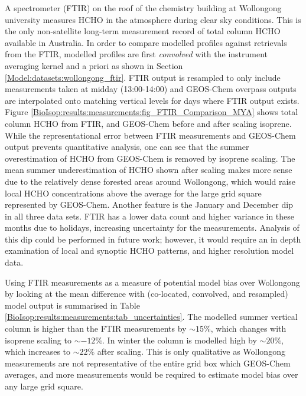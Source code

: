     A spectrometer (FTIR) on the roof of the chemistry building at Wollongong university measures HCHO in the atmosphere during clear sky conditions.
    This is the only non-satellite long-term measurement record of total column HCHO available in Australia.
    In order to compare modelled profiles against retrievals from the FTIR, modelled profiles are first \textit{convolved} with the instrument averaging kernel and a priori as shown in Section \ref{Model:datasets:wollongong_ftir}.
    FTIR output is resampled to only include measurements taken at midday (13:00-14:00) and GEOS-Chem overpass outputs are interpolated onto matching vertical levels for days where FTIR output exists.
    Figure \ref{BioIsop:results:measurements:fig_FTIR_Comparison_MYA} shows total column HCHO from FTIR, and GEOS-Chem before and after scaling isoprene.
    While the representational error between FTIR measurements and GEOS-Chem output prevents quantitative analysis, one can see that the summer overestimation of HCHO from GEOS-Chem is removed by isoprene scaling.
    The mean summer underestimation of HCHO shown after scaling makes more sense due to the relatively dense forested areas around Wollongong, which would raise local HCHO concentrations above the average for the large grid square represented by GEOS-Chem.
    Another feature is the January and December dip in all three data sets.
    FTIR has a lower data count and higher variance in these months due to holidays, increasing uncertainty for the measurements.
    Analysis of this dip could be performed in future work; however, it would require an in depth examination of local and synoptic HCHO patterns, and higher resolution model data.
    
  
    Using FTIR measurements as a measure of potential model bias over Wollongong by looking at the mean difference with (co-located, convolved, and resampled) model output is summarised in Table \ref{BioIsop:results:measurements:tab_uncertainties}.
    The modelled summer vertical column is higher than the FTIR measurements by $\sim{15}\%$, which changes with isoprene scaling to $\sim{-12}\%$.
    In winter the column is modelled high by $\sim{20}\%$, which increases to $\sim{22}\%$ after scaling.
    This is only qualitative as Wollongong measurements are not representative of the entire grid box which GEOS-Chem averages, and more measurements would be required to estimate model bias over any large grid square.
    
